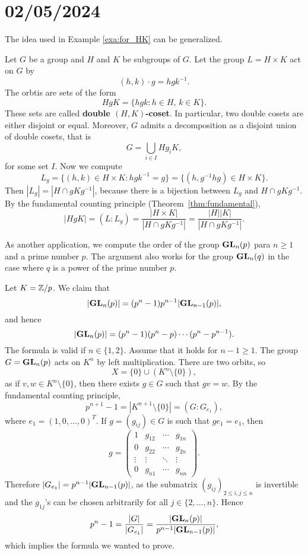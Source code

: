 \section{02/05/2024}


The idea used in Example \ref{exa:for_HK} can be generalized. 

\begin{example}
Let $G$ be a group and $H$ and $K$ be subgroups of $G$. Let the group $L=H\times K$ act on $G$ by
\[
(h,k)\cdot g=hgk^{-1}.
\]
The orbtis are sets of the form 
\[
HgK=\{hgk:h\in H,\,k\in K\}.
\]
These sets are called \textbf{double $(H,K)$-coset}. 
In particular, two double cosets are either disjoint 
or equal. Moreover, $G$ admits a decomposition 
as a disjoint union of double cosets, that is 
\[
G=\bigcup_{i\in I}Hg_iK,
\]
for some set $I$. Now we compute 
\[
L_g=\{(h,k)\in H\times K:hgk^{-1}=g\}=\{(h,g^{-1}hg)\in H\times K\}.
\]
Then $|L_g|=|H\cap gKg^{-1}|$, because there is a bijection between $L_g$ and
$H\cap gKg^{-1}$. By the fundamental counting principle (Theorem~\ref{thm:fundamental}), 
\[
|HgK|=(L:L_g)=\frac{|H\times K|}{|H\cap gKg^{-1}|}=\frac{|H||K|}{|H\cap gKg^{-1}|}.
\]
\end{example}

As another application, we compute the
order of the group $\mathbf{GL}_n(p)$ para $n\geq1$ and 
a prime number $p$. 
The argument also works for
the group $\mathbf{GL}_n(q)$ in the case where
$q$ is a power of the prime number $p$.

\begin{example}
Let $K=\mathbb{Z}/p$.
We claim that 
\[
|\mathbf{GL}_n(p)|=(p^n-1)p^{n-1}|\mathbf{GL}_{n-1}(p)|,
\]
and hence 
\[
|\mathbf{GL}_n(p)|=(p^n-1)(p^n-p)\cdots (p^n-p^{n-1}).
\]
The formula is valid if $n\in\{1,2\}$. 
Assume that it holds for $n-1\geq1$.
The group $G=\mathbf{GL}_{n}(p)$ acts on
$K^{n}$ by left multiplication. There are two orbits, so 
\[
X=\{0\}\cup (K^{n}\setminus\{0\}),
\]
as if $v,w\in K^{n}\setminus\{0\}$, then there exists 
$g\in G$ such that $gv=w$.
By the fundamental counting principle,  
\[
p^{n+1}-1=|K^{n+1}\setminus\{0\}|=(G:G_{e_1}),
\]
where $e_1=(1,0,\dots,0)^T$. If $g=(g_{ij})\in G$ is such that
$ge_1=e_1$, then 
\[
g=
\begin{pmatrix}
1 & g_{12} & \cdots & g_{1n}\\
0 & g_{22} & \cdots & g_{2n}\\
\vdots & \vdots & \ddots &\vdots\\
0 & g_{n1} & \cdots & g_{nn}
\end{pmatrix}.
\]
Therefore $|G_{e_1}|=p^{n-1}|\mathbf{GL}_{n-1}(p)|$, as the submatrix 
$(g_{ij})_{2\leq i,j\leq n}$ is invertible and the 
$g_{1j}$'s can be chosen 
arbitrarily for all $j\in\{2,\dots,n\}$.
Hence 
\[
p^{n}-1=\frac{|G|}{|G_{e_1}|}=\frac{|\mathbf{GL}_n(p)|}{p^{n-1}|\mathbf{GL}_{n-1}(p)|},
\]
which implies the formula we wanted to prove.
\end{example}




